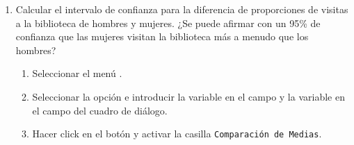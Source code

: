 \documentclass[a4paper]{article}
\begin{document}
\begin{enumerate}[leftmargin=*]
\begin{enumerate}
\item Calcular el intervalo de confianza para la diferencia de proporciones de visitas a la biblioteca de hombres y mujeres. ¿Se puede afirmar con un 95\% de confianza que las mujeres visitan la biblioteca más a menudo que los hombres?
\begin{indicacion}{
\begin{enumerate}
\item Seleccionar el menú .
\item Seleccionar la opción  e introducir la variable  en el campo  y la variable  en el campo  del cuadro de diálogo.
\item Hacer click en el botón  y activar la casilla \texttt{Comparación de Medias}.
\end{enumerate}}
\end{indicacion}
\end{enumerate}


\end{enumerate}
\end{document}
